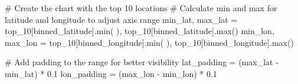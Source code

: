 \documentclass[
  letterpaper,
  DIV=11,
  numbers=noendperiod]{scrartcl}
\newenvironment{Shaded}{\begin{snugshade}}{\end{snugshade}}
\newcommand{\BuiltInTok}[1]{\textcolor[rgb]{0.00,0.23,0.31}{#1}}
\newcommand{\CommentTok}[1]{\textcolor[rgb]{0.37,0.37,0.37}{#1}}
\newcommand{\FloatTok}[1]{\textcolor[rgb]{0.68,0.00,0.00}{#1}}
\newcommand{\NormalTok}[1]{\textcolor[rgb]{0.00,0.23,0.31}{#1}}
\newcommand{\OperatorTok}[1]{\textcolor[rgb]{0.37,0.37,0.37}{#1}}
\newcommand{\StringTok}[1]{\textcolor[rgb]{0.13,0.47,0.30}{#1}}
\begin{document}
\begin{Shaded}
\begin{Highlighting}[]
\CommentTok{\# Create the chart with the top 10 locations}
\CommentTok{\# Calculate min and max for latitude and longitude to adjust axis range}
\NormalTok{min\_lat, max\_lat }\OperatorTok{=}\NormalTok{ top\_10[}\StringTok{\textquotesingle{}binned\_latitude\textquotesingle{}}\NormalTok{].}\BuiltInTok{min}\NormalTok{(}
\NormalTok{), top\_10[}\StringTok{\textquotesingle{}binned\_latitude\textquotesingle{}}\NormalTok{].}\BuiltInTok{max}\NormalTok{()}
\NormalTok{min\_lon, max\_lon }\OperatorTok{=}\NormalTok{ top\_10[}\StringTok{\textquotesingle{}binned\_longitude\textquotesingle{}}\NormalTok{].}\BuiltInTok{min}\NormalTok{(}
\NormalTok{), top\_10[}\StringTok{\textquotesingle{}binned\_longitude\textquotesingle{}}\NormalTok{].}\BuiltInTok{max}\NormalTok{()}

\CommentTok{\# Add padding to the range for better visibility}
\NormalTok{lat\_padding }\OperatorTok{=}\NormalTok{ (max\_lat }\OperatorTok{{-}}\NormalTok{ min\_lat) }\OperatorTok{*} \FloatTok{0.1}
\NormalTok{lon\_padding }\OperatorTok{=}\NormalTok{ (max\_lon }\OperatorTok{{-}}\NormalTok{ min\_lon) }\OperatorTok{*} \FloatTok{0.1}


\end{Highlighting}
\end{Shaded}
\end{document}
